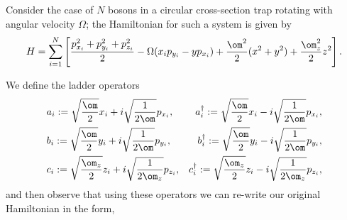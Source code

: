 \documentclass{article}
\begin{document}
Consider the case of $N$ bosons in a circular cross-section trap
rotating with angular velocity $\Omega$;  the Hamiltonian for such a
system is given by
$$H = \sum_{i=1}^N \left[\frac{p_{x_i}^2 + p_{y_i}^2 + p_{z_i}^2}{2} - \Omega(x_i
  p_{y_i} - y p_{x_i}) + \frac{\om^2}{2}(x^2+y^2) + \frac{\om_z^2}{2}z^2\right].$$

We define the ladder operators
$$
\begin{aligned}
&a_i:= \sqrt{\frac{\om}{2}}x_i + i\sqrt{\frac{1}{2\om}}p_{x_i},
&a_i^\dagger := \sqrt{\frac{\om}{2}}x_i - i\sqrt{\frac{1}{2\om}}p_{x_i},\\
&b_i:= \sqrt{\frac{\om}{2}}y_i + i\sqrt{\frac{1}{2\om}}p_{y_i},
&b_i^\dagger := \sqrt{\frac{\om}{2}}y_i - i\sqrt{\frac{1}{2\om}}p_{y_i} ,\\
&c_i:= \sqrt{\frac{\om_z}{2}}z_i + i\sqrt{\frac{1}{2\om_z}}p_{z_i},
&c_i^\dagger := \sqrt{\frac{\om_z}{2}}z_i - i\sqrt{\frac{1}{2\om_z}}p_{z_i} ,\\
\end{aligned}
$$
and then observe that using these operators we can re-write our
original Hamiltonian in the form,
\end{document}
